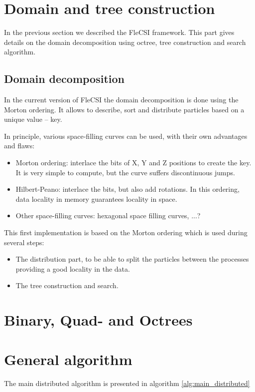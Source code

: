 \documentclass{article}
\begin{document}
\section{Domain and tree construction}
In the previous section we described the FleCSI framework.
This part gives details on the domain decomposition using octree, tree 
construction and search algorithm.

\subsection{Domain decomposition}
In the current version of FleCSI the domain decomposition is done using the
Morton ordering.
It allows to describe, sort and distribute particles based on a unique value
-- key.

In principle, various space-filling curves can be used, with their own
advantages and flaws:
\begin{itemize}
\item Morton ordering: interlace the bits of X, Y and Z positions to create
the key. It is very simple to compute, but the curve suffers discontinuous
jumps.
\item Hilbert-Peano: interlace the bits, but also add rotations. In this
ordering, data locality in memory guarantees locality in space.
\item Other space-filling curves: hexagonal space filling curves, ...?
\end{itemize}

This first implementation is based on the Morton ordering which is used during
several steps:
\begin{itemize}
\item The distribution part, to be able to split the particles between the
processes providing a good locality in the data.
\item The tree construction and search. 
\end{itemize}

\section{Binary, Quad- and Octrees}

\section{General algorithm}
The main distributed algorithm is presented in algorithm \ref{alg:main_distributed}
\end{document}
